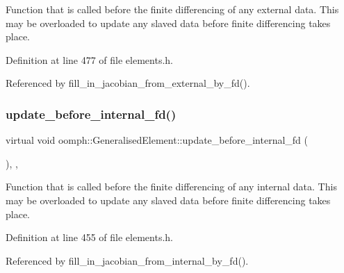 Function that is called before the finite differencing of any external data. This may be overloaded to update any slaved data before finite differencing takes place. 



Definition at line 477 of file elements.\+h.



Referenced by fill\+\_\+in\+\_\+jacobian\+\_\+from\+\_\+external\+\_\+by\+\_\+fd().

\mbox{\label{classoomph_1_1GeneralisedElement_a841503bfd99e2ccb1170b958190f6386}} 
\subsubsection{\texorpdfstring{update\+\_\+before\+\_\+internal\+\_\+fd()}{update\_before\_internal\_fd()}}
{\footnotesize\ttfamily virtual void oomph\+::\+Generalised\+Element\+::update\+\_\+before\+\_\+internal\+\_\+fd (\begin{DoxyParamCaption}{ }\end{DoxyParamCaption})\hspace{0.3cm}{\ttfamily [inline]}, {\ttfamily [protected]}, {\ttfamily [virtual]}}



Function that is called before the finite differencing of any internal data. This may be overloaded to update any slaved data before finite differencing takes place. 



Definition at line 455 of file elements.\+h.



Referenced by fill\+\_\+in\+\_\+jacobian\+\_\+from\+\_\+internal\+\_\+by\+\_\+fd().

\mbox{\label{classoomph_1_1GeneralisedElement_af740b8c507dde03700cff5d196e28019}} 
